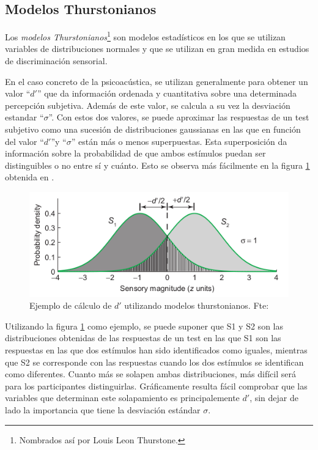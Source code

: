 \documentclass[11pt,a4paper]{book}
\begin{document}
        \subsection{Modelos Thurstonianos}
            Los \textit{modelos Thurstonianos}\footnote{Nombrados así por Louis Leon Thurstone.}\cite{PsychophysicsB, SignalB, delaPrida2019} son modelos estadísticos en los que se utilizan variables de distribuciones normales y que se utilizan en gran medida en estudios de discriminación sensorial. 
            
            En el caso concreto de la psicoacústica, se utilizan generalmente para obtener un valor ``$d'$'' que da información ordenada y cuantitativa sobre una determinada percepción subjetiva. Además de este valor, se calcula a su vez la desviación estandar ``$\sigma$''. Con estos dos valores, se puede aproximar las respuestas de un test subjetivo como una sucesión de distribuciones gaussianas en las que en función del valor ``$d'$''y ``$\sigma$'' están más o menos superpuestas. Esta superposición da información sobre la probabilidad de que ambos estímulos puedan ser distinguibles o no entre sí y cuánto. Esto se observa más fácilmente en la figura \ref{fig:modelost} obtenida en \cite{PsychophysicsB}.
            
            \begin{figure}[H]
                \includegraphics[scale=0.7]{../imagenes/modelosthurst.png}
			    \centering
			    \caption{Ejemplo de cálculo de $d'$ utilizando modelos thurstonianos. Fte: \cite{PsychophysicsB} }
			    \label{fig:modelost}
            \end{figure}
            
            Utilizando la figura \ref{fig:modelost} como ejemplo, se puede suponer que S1 y S2 son las distribuciones obtenidas de las respuestas de un test en las que S1 son las respuestas en las que dos estímulos han sido identificados como iguales, mientras que S2 se corresponde con las respuestas cuando los dos estímulos se identifican como diferentes. Cuanto más se solapen ambas distribuciones, más difícil será para los participantes distinguirlas. Gráficamente resulta fácil comprobar que las variables que determinan este solapamiento es principalemente $d'$, sin dejar de lado la importancia que tiene la desviación estándar $\sigma$.
            
\end{document}
